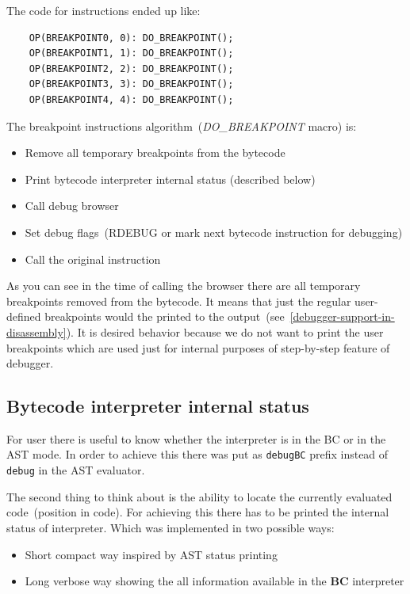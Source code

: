\documentclass[thesis=M,english]{FITthesis}[2018/10/20]
\newcommand{\code}[1]{\texttt{#1}}
\begin{document}
The code for instructions ended up like:

\begin{lstlisting}
    OP(BREAKPOINT0, 0): DO_BREAKPOINT();
    OP(BREAKPOINT1, 1): DO_BREAKPOINT();
    OP(BREAKPOINT2, 2): DO_BREAKPOINT();
    OP(BREAKPOINT3, 3): DO_BREAKPOINT();
    OP(BREAKPOINT4, 4): DO_BREAKPOINT();
\end{lstlisting}

The breakpoint instructions algorithm~(\textit{DO{\_}BREAKPOINT} macro) is:

\begin{itemize}
	\item Remove all temporary breakpoints from the bytecode
	\item Print bytecode interpreter internal status (described below)
	\item Call debug browser
	\item Set debug flags~(RDEBUG or mark next bytecode instruction for debugging)
	\item Call the original instruction
\end{itemize}

As you can see in the time of calling the browser there are all temporary breakpoints removed from the bytecode. It means that just the regular user-defined breakpoints would the printed to the output~(see~\ref{debugger-support-in-disassembly}). It is desired behavior because we do not want to print the user breakpoints which are used just for internal purposes of step-by-step feature of debugger.

\subsection{Bytecode interpreter internal status}\label{bytecode-interpreter-internal-status}

For user there is useful to know whether the interpreter is in the BC or in the AST mode. In order to achieve this there was put as \code{debugBC} prefix instead of \code{debug} in the AST evaluator.

The second thing to think about is the ability to locate the currently evaluated code~(position in code). For achieving this there has to be printed the internal status of interpreter. Which was implemented in two possible ways:

\begin{itemize}
	\item Short compact way inspired by AST status printing
	\item Long verbose way showing the all information available in the \textbf{BC} interpreter
\end{itemize}
\end{document}
